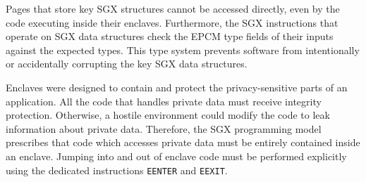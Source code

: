 
Pages that store key SGX structures cannot be accessed directly, even by the
code executing inside their enclaves. Furthermore, the SGX instructions that
operate on SGX data structures check the EPCM type fields of their inputs
against the expected types. This type system prevents software from
intentionally or accidentally corrupting the key SGX data structures.




%
%




Enclaves were designed to contain and protect the privacy-sensitive parts of an
application. All the code that handles private data must receive integrity
protection. Otherwise, a hostile environment could modify the code to leak
information about private data. Therefore, the SGX programming model prescribes
that code which accesses private data must be entirely contained inside an
enclave. Jumping into and out of enclave code must be performed explicitly
using the dedicated instructions \texttt{EENTER} and \texttt{EEXIT}.



